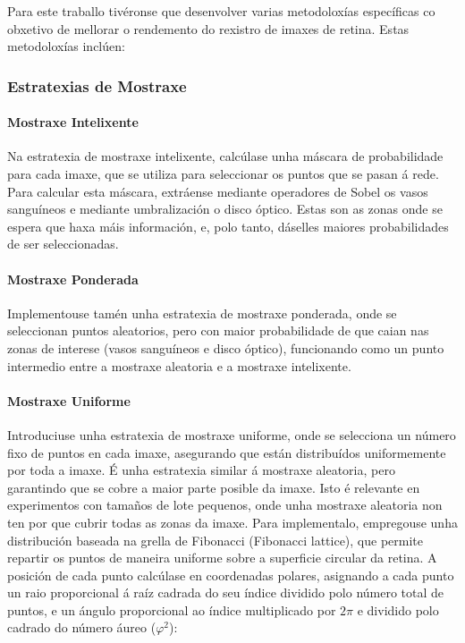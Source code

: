 Para este traballo tivéronse que desenvolver varias metodoloxías específicas co obxetivo de mellorar o rendemento do rexistro de imaxes de retina. Estas metodoloxías inclúen:

\subsubsection{Estratexias de Mostraxe}
\label{subsubsec:estratexias_mostraxe}

\paragraph{Mostraxe Intelixente}
Na estratexia de mostraxe intelixente, calcúlase unha máscara de probabilidade para cada imaxe, que se utiliza para seleccionar os puntos que se pasan á rede. Para calcular esta máscara, extráense mediante operadores de Sobel os vasos sanguíneos e mediante umbralización o disco óptico. Estas son as zonas onde se espera que haxa máis información, e, polo tanto, dáselles maiores probabilidades de ser seleccionadas.

\paragraph{Mostraxe Ponderada}
Implementouse tamén unha estratexia de mostraxe ponderada, onde se seleccionan puntos aleatorios, pero con maior probabilidade de que caian nas zonas de interese (vasos sanguíneos e disco óptico), funcionando como un punto intermedio entre a mostraxe aleatoria e a mostraxe intelixente. 

\paragraph{Mostraxe Uniforme}
Introduciuse unha estratexia de mostraxe uniforme, onde se selecciona un número fixo de puntos en cada imaxe, asegurando que están distribuídos uniformemente por toda a imaxe. É unha estratexia similar á mostraxe aleatoria, pero garantindo que se cobre a maior parte posible da imaxe. Isto é relevante en experimentos con tamaños de lote pequenos, onde unha mostraxe aleatoria non ten por que cubrir todas as zonas da imaxe. Para implementalo, empregouse unha distribución baseada na grella de Fibonacci (Fibonacci lattice), que permite repartir os puntos de maneira uniforme sobre a superficie circular da retina. A posición de cada punto calcúlase en coordenadas polares, asignando a cada punto un raio proporcional á raíz cadrada do seu índice dividido polo número total de puntos, e un ángulo proporcional ao índice multiplicado por $2\pi$ e dividido polo cadrado do número áureo ($\varphi^2$):

